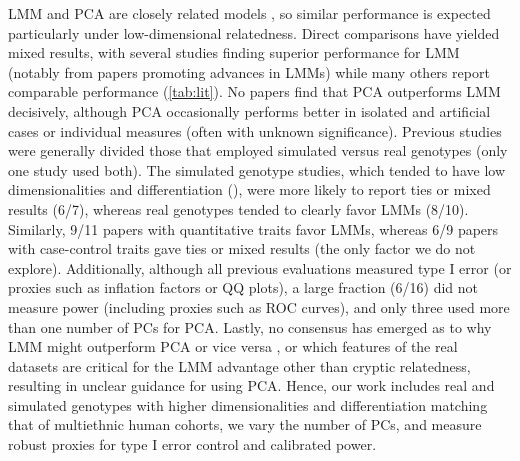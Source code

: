 \documentclass[11pt]{article}
\begin{document}
\begin{linenumbers}
LMM and PCA are closely related models \citep{astle_population_2009, janss_inferences_2012, hoffman_correcting_2013, zhang_principal_2015}, so similar performance is expected particularly under low-dimensional relatedness.
Direct comparisons have yielded mixed results, with several studies finding superior performance for LMM (notably from papers promoting advances in LMMs) while many others report comparable performance (\cref{tab:lit}).
No papers find that PCA outperforms LMM decisively, although PCA occasionally performs better in isolated and artificial cases or individual measures (often with unknown significance).
Previous studies were generally divided those that employed simulated versus real genotypes (only one study used both).
The simulated genotype studies, which tended to have low dimensionalities and differentiation (\Fst), were more likely to report ties or mixed results (6/7), whereas real genotypes tended to clearly favor LMMs (8/10).
Similarly, 9/11 papers with quantitative traits favor LMMs, whereas 6/9 papers with case-control traits gave ties or mixed results (the only factor we do not explore).
Additionally, although all previous evaluations measured type I error (or proxies such as inflation factors or QQ plots), a large fraction (6/16) did not measure power (including proxies such as ROC curves), and only three used more than one number of PCs for PCA.
Lastly, no consensus has emerged as to why LMM might outperform PCA or vice versa \citep{price_new_2010, sul_mixed_2013, price_response_2013, hoffman_correcting_2013}, or which features of the real datasets are critical for the LMM advantage other than cryptic relatedness, resulting in unclear guidance for using PCA.
Hence, our work includes real and simulated genotypes with higher dimensionalities and differentiation matching that of multiethnic human cohorts, we vary the number of PCs, and measure robust proxies for type I error control and calibrated power.


\end{linenumbers}
\end{document}
